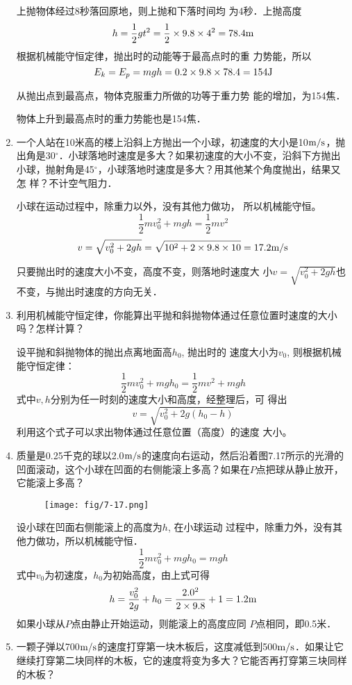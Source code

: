 \begin{enumerate}
\begin{solution}
上抛物体经过8秒落回原地，则上抛和下落时间均
为4秒．上抛高度
\[h=\frac{1}{2}gt^2=\frac{1}{2}\times 9.8\times 4^2=78.4{\rm m}\]
根据机械能守恒定律，抛出时的动能等于最高点时的重
力势能，所以
\[E_k=E_p=mgh=0.2\times9.8\times78.4=154{\rm J}\]

从抛出点到最高点，物体克服重力所做的功等于重力势
能的增加，为154焦．

物体上升到最高点时的重力势能也是154焦．
\end{solution}
\item 一个人站在10米高的楼上沿斜上方抛出一个小球，初速度的大小是10$\text{m}/\text{s}$，抛出角是30$^\circ$．小球落地时速度是多大？如果初速度的大小不变，沿斜下方抛出小球，抛射角是45$^\circ$，小球落地时速度是多大？用其他某个角度抛出，结果又怎
样？不计空气阻力．

\begin{solution}
小球在运动过程中，除重力以外，没有其他力做功，
所以机械能守恒。
\[\frac{1}{2}mv_0^2+mgh=\frac{1}{2}mv^2\]
\[v=\sqrt{v^2_0+2gh}=\sqrt{10^2+2\times9.8\times10}=17.2\text{m}/\text{s}\]

只要抛出时的速度大小不变，高度不变，则落地时速度大
小$v=\sqrt{v^2_0+2gh}$也不变，与抛出时速度的方向无关．
\end{solution}
\item 利用机械能守恒定律，你能算出平抛和斜抛物体通过任意位置时速度的大小吗？怎样计算？

\begin{solution}
设平抛和斜抛物体的抛出点离地面高$h_0$, 抛出时的
速度大小为$v_0$, 则根据机械能守恒定律：
\[\frac{1}{2}mv_0^2+mgh_0=\frac{1}{2}mv^2+mgh\]
式中$v,h$分别为任一时刻的速度大小和高度，经整理后，可
得出
\[v=\sqrt{v^2_0+2g(h_0-h)}\]
利用这个式子可以求出物体通过任意位置（高度）的速度
大小。
\end{solution}
\item 质量是0.25千克的球以2.0$\text{m}/\text{s}$的速度向右运动，然后沿着图7.17所示的光滑的凹面滚动，这个小球在凹面的右侧能滚上多高？如果在$P$点把球从静止放开，它能滚上多高？
\begin{figure}[htp]\centering
\texttt{[image: fig/7-17.png]}
\caption{}
\end{figure}

\begin{solution}
设小球在凹面右侧能滚上的高度为$h$, 在小球运动
过程中，除重力外，没有其他力做功，所以机械能守恒．
\[\frac{1}{2}mv^2_0+mgh_0=mgh\]
式中$v_0$为初速度，$h_0$为初始高度，由上式可得
\[h=\frac{v^2_0}{2g}+h_0=\frac{2.0^2}{2\times 9.8}+1=1.2{\rm m}\]
如果小球从$P$点由静止开始运动，则能滚上的高度应同
$P$点相同，即0.5米．
\end{solution}
\item  一颗子弹以700$\text{m}/\text{s}$的速度打穿第一块木板后，这度减低到500$\text{m}/\text{s}$．如果让它继续打穿第二块同样的木板，它的速度将变为多大？它能否再打穿第三块同样的木板？


\end{enumerate}
